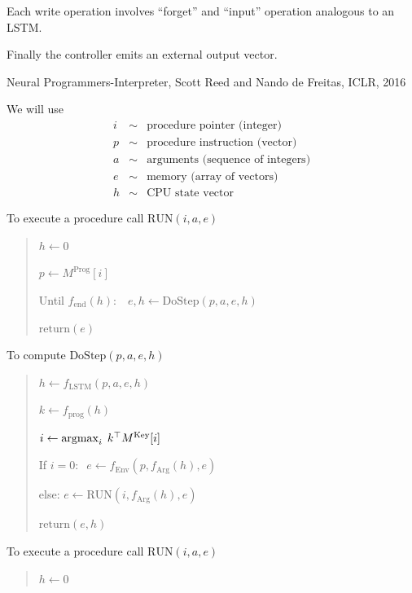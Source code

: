 {\vfill
Each write operation involves ``forget'' and ``input'' operation analogous to an LSTM.

\vfill
Finally the controller emits an external output vector.


Neural Programmers-Interpreter, Scott Reed and Nando de Freitas, ICLR, 2016


We will use
\begin{eqnarray*}
i &\sim & \mbox{procedure pointer (integer)} \\
p &\sim & \mbox{procedure instruction (vector)} \\
a &\sim & \mbox{arguments (sequence of integers)} \\
e &\sim& \mbox{memory (array of vectors)} \\
h & \sim& \mbox{CPU state vector}
\end{eqnarray*}

To execute a procedure call $\mathrm{RUN}(i,a,e)$

\vfill
\begin{quotation}
$h \leftarrow 0$

$p \leftarrow  M^{\mathrm{Prog}}[i]$

\vfill
Until $f_{\mathrm{end}}(h): \;\;\;e,h \leftarrow \mathrm{DoStep}(p,a,e,h)$

\vfill
$\mathrm{return}(e)$
\end{quotation}


To compute $\mathrm{DoStep}(p,a,e,h)$

\vfill
\begin{quotation}
$h \leftarrow f_{\mathrm{LSTM}}(p,a,e,h)$

\vfill
$k \leftarrow f_{\mathrm{prog}}(h)$

\vfill
$i \leftarrow \operatorname*{argmax}_i\; k^\top M^{\mathrm{Key}}[i]$

\vfill
If $i = 0:\;\;e \leftarrow f_{\mathrm{Env}}(p,f_{\mathrm{Arg}}(h),e)$

\vfill
else: $e \leftarrow \mathrm{RUN}(i,f_\mathrm{Arg}(h),e)$

\vfill
$\mathrm{return}(e,h)$
\end{quotation}



To execute a procedure call $\mathrm{RUN}(i,a,e)$

\vfill
\begin{quotation}
$h \leftarrow 0$


\end{quotation}}
